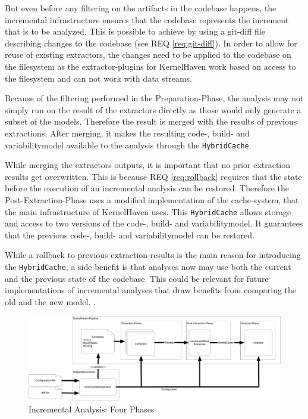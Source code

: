 \documentclass[a4paper]{article}
\begin{document}
 But even before any filtering on the artifacts in the codebase happens, the incremental infrastructure ensures that the codebase represents the increment that is to be analyzed. This is possible to achieve by using a git-diff file describing changes to the codebase (see REQ \ref{req:git-diff}). In order to allow for reuse of existing extractors, the changes need to be applied to the codebase on the filesystem as the extractor-plugins for KernelHaven work based on access to the filesystem and can not work with data streams.

Because of the filtering performed in the Preparation-Phase, the analysis may not simply run on the result of the extractors directly as those would only generate a subset of the models. Therefore the result is merged with the results of previous extractions. After merging, it makes the resulting code-, build- and variabilitymodel available to the analysis through the \texttt{HybridCache}.

While merging the extractors outputs, it is important that no prior extraction results get overwritten. This is because REQ \ref{req:rollback} requires that the state before the execution of an incremental analysis can be restored. Therefore the Post-Extraction-Phase uses a modified implementation of the cache-system, that the main infrastructure of KernelHaven uses. This \texttt{HybridCache} allows storage and access to two versions of the code-, build- and variabilitymodel. It guarantees that the previous code-, build- and variabilitymodel can be restored.

While a rollback to previous extraction-results is the main reason for introducing the \texttt{HybridCache}, a side benefit is that analyses now may use both the current and the previous state of the codebase. This could be relevant for future implementations of incremental analyses that draw benefits from comparing the old and the new model. .

\begin{figure}[h] 
  \centering
  \begin{minipage}[b]{1\textwidth} 
    \caption[Incremental Analysis: Four Phases]{Incremental Analysis: Four Phases}\label{4-phases}
    \includegraphics[width=1\textwidth]{img/KernelHavenIncremental.pdf}
  \end{minipage}
\end{figure}
\end{document}
